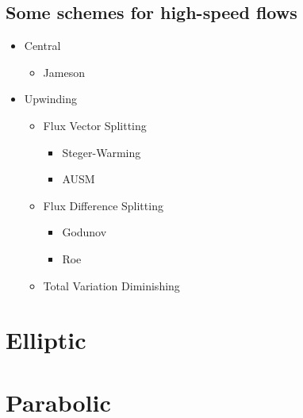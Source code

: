 \documentclass[oneside,a4paper,11pt]{report}
\begin{document}
\section{Some schemes for high-speed flows}
\begin{itemize}
    \item Central
    \begin{itemize}
        \item Jameson
    \end{itemize}
    \item Upwinding
    \begin{itemize}
        \item Flux Vector Splitting
        \begin{itemize}
             \item Steger-Warming
             \item AUSM
        \end{itemize}
        \item Flux Difference Splitting
        \begin{itemize}
            \item Godunov
            \item Roe
       \end{itemize}
        \item Total Variation Diminishing
    \end{itemize}
\end{itemize}

\chapter{Elliptic}

\chapter{Parabolic}
\end{document}
